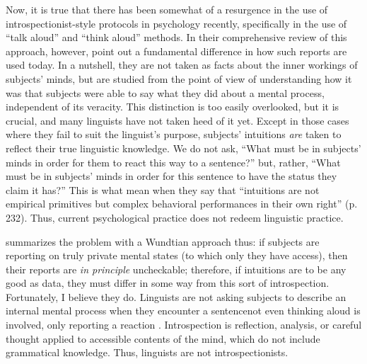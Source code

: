 Now, it is true that there has been somewhat of a resurgence in the use of introspectionist-style protocols in psychology recently, specifically in the use of ``talk aloud'' and ``think aloud'' methods. In their comprehensive review of this approach, however, \citet{EricssonEtAl1984} point out a fundamental difference in how such reports are used today. In a nutshell, they are not taken as facts about the inner workings of subjects' minds, but are studied from the point of view of understanding how it was that subjects were able to say what they did about a mental process, independent of its veracity. This distinction is too easily overlooked, but it is crucial, and many linguists have not taken heed of it yet. Except in those cases where they fail to suit the linguist's purpose, subjects' intuitions \textit{are} taken to reflect their true linguistic knowledge. We do not ask, ``What must be in subjects' minds in order for them to react this way to a sentence?'' but, rather, ``What must be in subjects' minds in order for this sentence to have the status they claim it has?'' This is what \citet{BeverEtAl1981} mean when they say that ``intuitions are not empirical primitives but complex behavioral performances in their own right'' (p. 232). Thus, current psychological practice does not redeem linguistic practice.

\citet{Ringen1977} summarizes the problem with a Wundtian approach thus: if subjects are reporting on truly private mental states (to which only they have access), then their reports are \textit{in principle} uncheckable; therefore, if intuitions are to be any good as data, they must differ in some way from this sort of introspection. Fortunately, I believe they do. Linguists are not asking subjects to describe an internal mental process when they encounter a sentence\schdash{}not even thinking aloud is involved, only reporting a reaction \citep{Cohen1981}. Introspection is reflection, analysis, or careful thought applied to accessible contents of the mind, which do not include grammatical knowledge. Thus, linguists are not introspectionists.

